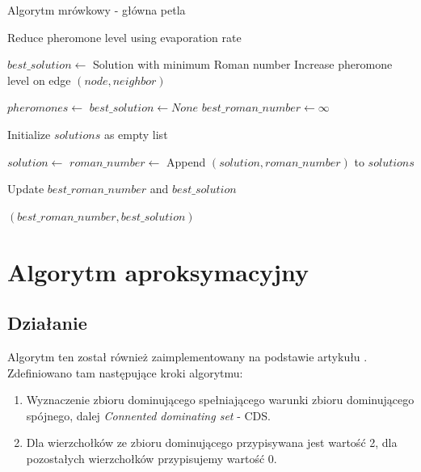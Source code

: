 \begin{algorithm}
    \caption*{Algorytm mrówkowy - główna petla}
    \begin{algorithmic}[1]
    
            \State Reduce pheromone level using evaporation rate
        \EndFor

        \State $best\_solution \gets$ Solution with minimum Roman number
                \State Increase pheromone level on edge $(node, neighbor)$
            \EndFor
        \EndFor
    \EndFunction

        \State $pheromones \gets$ 
        \State $best\_solution \gets None$
        \State $best\_roman\_number \gets \infty$

            \State Initialize $solutions$ as empty list

                \State $solution \gets$ 
                \State $roman\_number \gets$ 
                \State Append $(solution, roman\_number)$ to $solutions$

                    \State Update $best\_roman\_number$ and $best\_solution$
                \EndIf
            \EndFor

            \State {}
        \EndFor

        \State \Return $(best\_roman\_number, best\_solution)$
    \EndFunction
    
    \end{algorithmic}
\end{algorithm}

\FloatBarrier
\section{Algorytm aproksymacyjny}
\subsection{Działanie}

Algorytm ten został również zaimplementowany na podstawie artykułu \cite{ILP}. Zdefiniowano tam następujące kroki algorytmu:
\begin{enumerate}
    \item Wyznaczenie zbioru dominującego spełniającego warunki zbioru dominującego spójnego, dalej \textit{Connented dominating set} - CDS.
    \item Dla wierzchołków ze zbioru dominującego przypisywana jest wartość 2, dla pozostałych wierzchołków przypisujemy wartość 0.
\end{enumerate}

